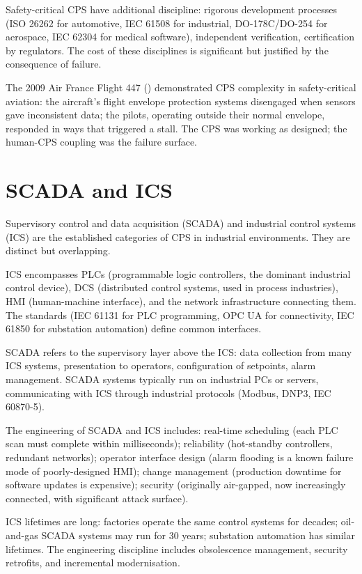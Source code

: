 Safety-critical CPS have additional discipline: rigorous development processes (ISO 26262 for automotive, IEC 61508 for industrial, DO-178C/DO-254 for aerospace, IEC 62304 for medical software), independent verification, certification by regulators. The cost of these disciplines is significant but justified by the consequence of failure.

The 2009 Air France Flight 447 (\cite{acc:bea-af447}) demonstrated CPS complexity in safety-critical aviation: the aircraft's flight envelope protection systems disengaged when sensors gave inconsistent data; the pilots, operating outside their normal envelope, responded in ways that triggered a stall. The CPS was working as designed; the human-CPS coupling was the failure surface.

\section{SCADA and ICS}

Supervisory control and data acquisition (SCADA) and industrial control systems (ICS) are the established categories of CPS in industrial environments. They are distinct but overlapping.

ICS encompasses PLCs (programmable logic controllers, the dominant industrial control device), DCS (distributed control systems, used in process industries), HMI (human-machine interface), and the network infrastructure connecting them. The standards (IEC 61131 for PLC programming, OPC UA for connectivity, IEC 61850 for substation automation) define common interfaces.

SCADA refers to the supervisory layer above the ICS: data collection from many ICS systems, presentation to operators, configuration of setpoints, alarm management. SCADA systems typically run on industrial PCs or servers, communicating with ICS through industrial protocols (Modbus, DNP3, IEC 60870-5).

The engineering of SCADA and ICS includes: real-time scheduling (each PLC scan must complete within milliseconds); reliability (hot-standby controllers, redundant networks); operator interface design (alarm flooding is a known failure mode of poorly-designed HMI); change management (production downtime for software updates is expensive); security (originally air-gapped, now increasingly connected, with significant attack surface).

ICS lifetimes are long: factories operate the same control systems for decades; oil-and-gas SCADA systems may run for $30$ years; substation automation has similar lifetimes. The engineering discipline includes obsolescence management, security retrofits, and incremental modernisation.

